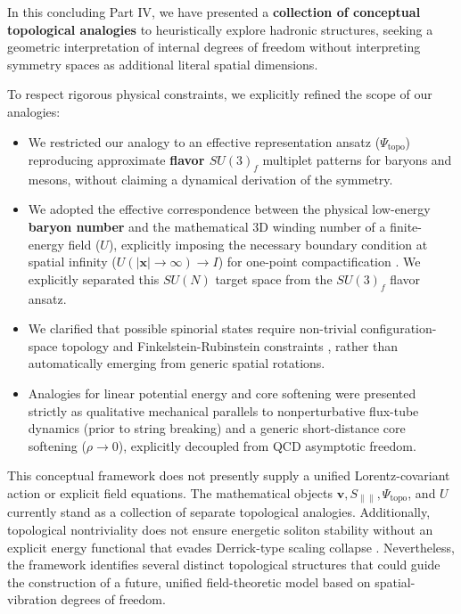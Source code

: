 \documentclass[reprint,amsmath,amssymb,aps,prd]{revtex4-2}
\begin{document}
In this concluding Part IV, we have presented a \textbf{collection of conceptual topological analogies} to heuristically explore hadronic structures, seeking a geometric interpretation of internal degrees of freedom without interpreting symmetry spaces as additional literal spatial dimensions.

To respect rigorous physical constraints, we explicitly refined the scope of our analogies:
\begin{itemize}
    \item We restricted our analogy to an effective representation ansatz ($\Psi_{\mathrm{topo}}$) reproducing approximate \textbf{flavor $SU(3)_f$} multiplet patterns for baryons and mesons, without claiming a dynamical derivation of the symmetry.
    \item We adopted the effective correspondence between the physical low-energy \textbf{baryon number} and the mathematical 3D winding number of a finite-energy field ($U$), explicitly imposing the necessary boundary condition at spatial infinity ($U(|\mathbf{x}| \to \infty) \to I$) for one-point compactification \cite{Skyrme1961}. We explicitly separated this $SU(N)$ target space from the $SU(3)_f$ flavor ansatz.
    \item We clarified that possible spinorial states require non-trivial configuration-space topology and Finkelstein-Rubinstein constraints \cite{Finkelstein1968}, rather than automatically emerging from generic spatial rotations.
    \item Analogies for linear potential energy and core softening were presented strictly as qualitative mechanical parallels to nonperturbative flux-tube dynamics (prior to string breaking) and a generic short-distance core softening ($\rho \to 0$), explicitly decoupled from QCD asymptotic freedom.
\end{itemize}

This conceptual framework does not presently supply a unified Lorentz-covariant action or explicit field equations. The mathematical objects $\mathbf{v}, S_{\parallel\parallel}, \Psi_{\mathrm{topo}}$, and $U$ currently stand as a collection of separate topological analogies. Additionally, topological nontriviality does not ensure energetic soliton stability without an explicit energy functional that evades Derrick-type scaling collapse \cite{Derrick1964}. Nevertheless, the framework identifies several distinct topological structures that could guide the construction of a future, unified field-theoretic model based on spatial-vibration degrees of freedom.
\end{document}
